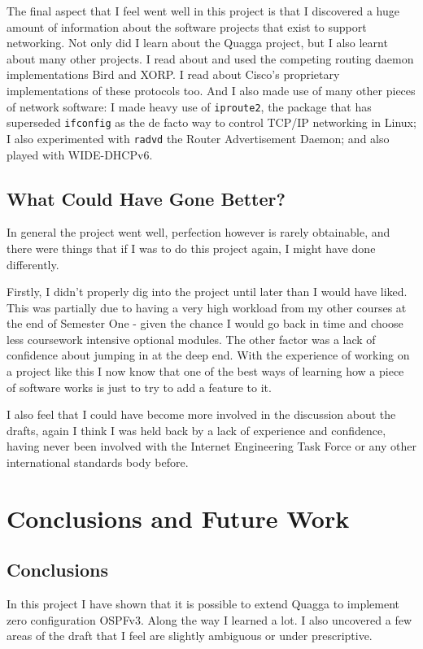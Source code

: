 \documentclass[12pt]{report}
\begin{document}
The final aspect that I feel went well in this project is that I discovered a
huge amount of information about the software projects that exist to support
networking. Not only did I learn about the Quagga project, but I also learnt
about many other projects. I read about and used the competing routing daemon
implementations Bird and XORP\@. I read about Cisco's proprietary implementations of
these protocols too. And I also made use of many other pieces of network
software: I made heavy use of \texttt{iproute2}, the package that has
superseded \texttt{ifconfig} as the de facto way to control TCP/IP networking
in Linux; I also experimented with \texttt{radvd} the Router Advertisement
Daemon; and also played with WIDE-DHCPv6. 

\section{What Could Have Gone Better?}
In general the project went well, perfection however is rarely obtainable, and
there were things that if I was to do this project again, I might have done
differently. 

Firstly, I didn't properly dig into the project until later than I would have
liked.  This was partially due to having a very high workload from my other
courses at the end of Semester One - given the chance I would go back in time
and choose less coursework intensive optional modules. The other factor was a
lack of confidence about jumping in at the deep end. With the experience of
working on a project like this I now know that one of the best ways of learning
how a piece of software works is just to try to add a feature to it.

I also feel that I could have become more involved in the discussion about the
drafts, again I think I was held back by a lack of experience and confidence,
having never been involved with the Internet Engineering Task Force or any
other international standards body before. 
 
\chapter{Conclusions and Future Work}

\section{Conclusions}
In this project I have shown that it is possible to extend Quagga to implement
zero configuration OSPFv3. Along the way I learned a lot. I also uncovered a
few areas of the draft that I feel are slightly ambiguous or under
prescriptive. 
\end{document}
